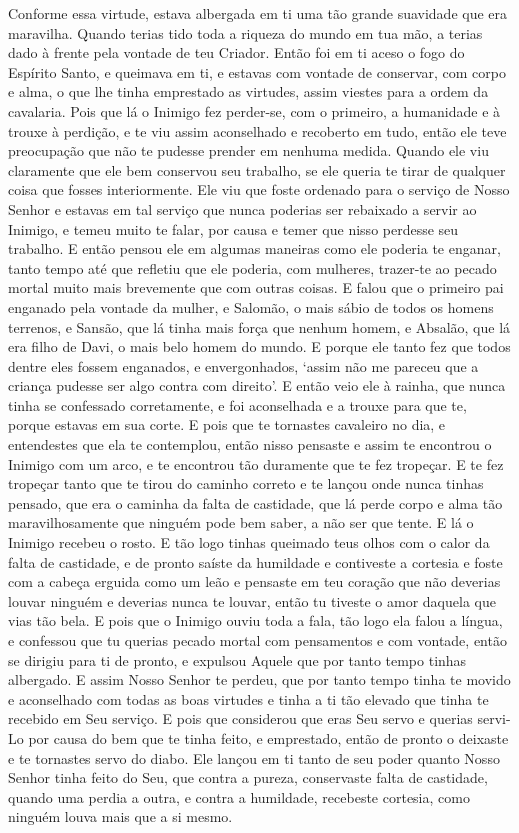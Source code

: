 Conforme essa virtude, estava albergada em ti uma tão grande suavidade que
era maravilha. Quando terias tido toda a riqueza do mundo em tua mão, a terias
dado à frente pela vontade de teu Criador. Então foi em ti aceso o fogo do
Espírito Santo, e queimava em ti, e estavas com vontade de conservar, com corpo
e alma, o que lhe tinha emprestado as virtudes, assim viestes para a ordem da
cavalaria. Pois que lá o Inimigo fez perder-se, com o primeiro, a humanidade e
à trouxe à perdição, e te viu assim aconselhado e recoberto em tudo, então ele
teve preocupação que não te pudesse prender em nenhuma medida. Quando ele viu
claramente que ele bem conservou seu trabalho, se ele queria te tirar de
qualquer coisa que fosses interiormente. Ele viu que foste ordenado para o
serviço de Nosso Senhor e estavas em tal serviço que nunca poderias ser
rebaixado a servir ao Inimigo, e temeu muito te falar, por causa e temer que
nisso perdesse seu trabalho. E então pensou ele em algumas maneiras como ele
poderia te enganar, tanto tempo até que refletiu que ele poderia, com mulheres,
trazer-te ao pecado mortal muito mais brevemente que com outras coisas. E falou
que o primeiro pai enganado pela vontade da mulher, e Salomão, o mais sábio de
todos os homens terrenos, e Sansão, que lá tinha mais força que nenhum homem, e
Absalão, que lá era filho de Davi, o mais belo homem do mundo. E porque ele
tanto fez que todos dentre eles fossem enganados, e envergonhados, ‘assim não
me pareceu que a criança pudesse ser algo contra com direito’. E então veio ele
à rainha, que nunca tinha se confessado corretamente, e foi aconselhada e a
trouxe para que te, porque estavas em sua corte. E pois que te tornastes
cavaleiro no dia, e entendestes que ela te contemplou, então nisso pensaste e
assim te encontrou o Inimigo com um arco, e te encontrou tão duramente que te
fez tropeçar. E te fez tropeçar tanto que te tirou do caminho correto e te
lançou onde nunca tinhas pensado, que era o caminha da falta de castidade, que
lá perde corpo e alma tão maravilhosamente que ninguém pode bem saber, a não
ser que tente. E lá o Inimigo recebeu o rosto. E tão logo tinhas queimado teus
olhos com o calor da falta de castidade, e de pronto saíste da humildade e
contiveste a cortesia e foste com a cabeça erguida como um leão e pensaste em
teu coração que não deverias louvar ninguém e deverias nunca te louvar, então
tu tiveste o amor daquela que vias tão bela. E pois que o
Inimigo ouviu toda a fala, tão logo ela falou a língua, e confessou que tu
querias pecado mortal com pensamentos e com vontade, então se dirigiu para ti
de pronto, e expulsou Aquele que por tanto tempo tinhas albergado. E assim
Nosso Senhor te perdeu, que por tanto tempo tinha te movido e aconselhado com
todas as boas virtudes e tinha a ti tão elevado que tinha te recebido em Seu
serviço. E pois que considerou que eras Seu servo e querias servi-Lo por causa
do bem que te tinha feito, e emprestado, então de pronto o deixaste e te
tornastes servo do diabo. Ele lançou em ti tanto de seu poder quanto Nosso
Senhor tinha feito do Seu, que contra a pureza, conservaste falta de castidade,
quando uma perdia a outra, e contra a humildade, recebeste cortesia, como
ninguém louva mais que a si mesmo.

